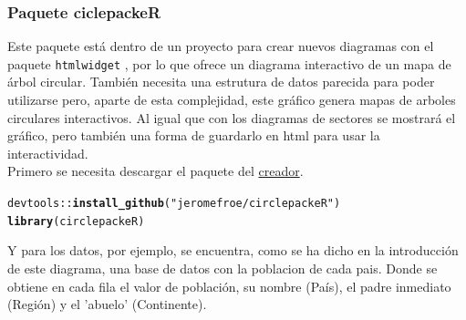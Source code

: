 \documentclass{article}\usepackage[]{graphicx}\usepackage[]{color}
\makeatletter
\newcommand{\hlstr}[1]{\textcolor[rgb]{0.192,0.494,0.8}{#1}}%
\newcommand{\hlopt}[1]{\textcolor[rgb]{0,0,0}{#1}}%
\newcommand{\hlstd}[1]{\textcolor[rgb]{0.345,0.345,0.345}{#1}}%
\newcommand{\hlkwd}[1]{\textcolor[rgb]{0.737,0.353,0.396}{\textbf{#1}}}%
\newenvironment{kframe}{%
 \def\at@end@of@kframe{}%
 \ifinner\ifhmode%
  \def\at@end@of@kframe{\end{minipage}}%
  \begin{minipage}{\columnwidth}%
 \fi\fi%
 \def\FrameCommand##1{\hskip\@totalleftmargin \hskip-\fboxsep
 \colorbox{shadecolor}{##1}\hskip-\fboxsep
     \hskip-\linewidth \hskip-\@totalleftmargin \hskip\columnwidth}%
 \MakeFramed {\advance\hsize-\width
   \@totalleftmargin\z@ \linewidth\hsize
   \@setminipage}}%
 {\par\unskip\endMakeFramed%
 \at@end@of@kframe}
\newenvironment{knitrout}{}{} %
\makeatother
\begin{document}
\subsubsection{Paquete ciclepackeR}
Este paquete \cite{docu_circlepacker} 
est\'a dentro de un proyecto para crear nuevos diagramas con el paquete \texttt{htmlwidget} \cite{docu_htmlwidget},
 por lo que ofrece un diagrama interactivo de un mapa de \'arbol circular. Tambi\'en necesita una estrutura de datos parecida para poder utilizarse pero, aparte de esta complejidad, este gr\'afico genera mapas de arboles circulares interactivos. Al igual que con los diagramas de sectores se mostrar\'a el gr\'afico, pero tambi\'en una forma de guardarlo en html para usar la interactividad.~\\
Primero se necesita descargar el paquete del \href{https://github.com/jeromefroe/circlepackeR}{creador}.
\begin{knitrout}
\color{fgcolor}\begin{kframe}
\begin{alltt}
\hlstd{devtools}\hlopt{::}\hlkwd{install_github}\hlstd{(}\hlstr{"jeromefroe/circlepackeR"}\hlstd{)}
\hlkwd{library}\hlstd{(circlepackeR)}
\end{alltt}
\end{kframe}
\end{knitrout}

Y para los datos, por ejemplo, se encuentra, como se ha dicho en la introducci\'on de este diagrama, una base de datos con la poblacion de cada pais. Donde se obtiene en cada fila el valor de poblaci\'on, su nombre (Pa\'is), el padre inmediato (Regi\'on) y el 'abuelo' (Continente).
\end{document}
